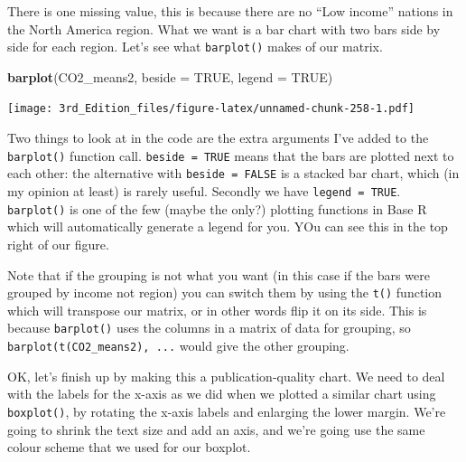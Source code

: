 \documentclass[
]{book}
\newenvironment{Shaded}{\begin{snugshade}}{\end{snugshade}}
\newcommand{\DataTypeTok}[1]{\textcolor[rgb]{0.13,0.29,0.53}{#1}}
\newcommand{\KeywordTok}[1]{\textcolor[rgb]{0.13,0.29,0.53}{\textbf{#1}}}
\newcommand{\NormalTok}[1]{#1}
\newcommand{\OtherTok}[1]{\textcolor[rgb]{0.56,0.35,0.01}{#1}}
\begin{document}
There is one missing value, this is because there are no ``Low income'' nations in the North America region. What we want is a bar chart with two bars side by side for each region. Let's see what \texttt{barplot()} makes of our matrix.

\begin{Shaded}
\begin{Highlighting}[]
\KeywordTok{barplot}\NormalTok{(CO2_means2, }
        \DataTypeTok{beside =} \OtherTok{TRUE}\NormalTok{,}
        \DataTypeTok{legend =} \OtherTok{TRUE}\NormalTok{)}
\end{Highlighting}
\end{Shaded}

\texttt{[image: 3rd\_Edition\_files/figure-latex/unnamed-chunk-258-1.pdf]}

Two things to look at in the code are the extra arguments I've added to the \texttt{barplot()} function call. \texttt{beside\ =\ TRUE} means that the bars are plotted next to each other: the alternative with \texttt{beside\ =\ FALSE} is a stacked bar chart, which (in my opinion at least) is rarely useful. Secondly we have \texttt{legend\ =\ TRUE}. \texttt{barplot()} is one of the few (maybe the only?) plotting functions in Base R which will automatically generate a legend for you. YOu can see this in the top right of our figure.

Note that if the grouping is not what you want (in this case if the bars were grouped by income not region) you can switch them by using the \texttt{t()} function which will transpose our matrix, or in other words flip it on its side. This is because \texttt{barplot()} uses the columns in a matrix of data for grouping, so \texttt{barplot(t(CO2\_means2),\ ...} would give the other grouping.

OK, let's finish up by making this a publication-quality chart. We need to deal with the labels for the x-axis as we did when we plotted a similar chart using \texttt{boxplot()}, by rotating the x-axis labels and enlarging the lower margin. We're going to shrink the text size and add an axis, and we're going use the same colour scheme that we used for our boxplot.
\end{document}
